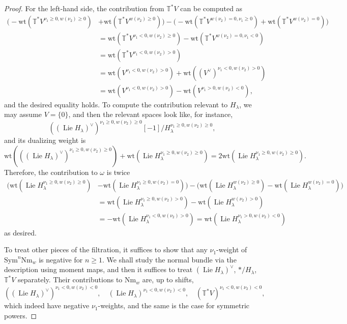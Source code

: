 \documentclass{amsart}
\theoremstyle{definition}
\theoremstyle{remark}
\numberwithin{equation}{section}
\DeclareMathOperator{\Lie}{Lie}
\newcommand{\Sym}{\mathrm{Sym}}
\newcommand{\T}{\mathbb{T}}
\newcommand{\wt}{\mathrm{wt}}
\newcommand{\Nm}{\mathrm{Nm}}
\begin{document}
\begin{proof}
For the left-hand side, the contribution from $\T^* V$ can be computed as
\begin{align*}
\bigl(-\wt(\T^* V^{\nu_1 \geq 0, w(\nu_2)\geq 0}) & +  \wt (\T^* V^{w(\nu_2)\geq 0})\bigr) -  \bigl(-\wt(\T^* V^{w(\nu_2)=0, \nu_1\geq 0}) + \wt(\T^* V^{w(\nu_2)=0})\bigr) \\
&=    
\wt(\T^* V^{\nu_1 < 0, w(\nu_2)\geq 0})  -  \wt(\T^* V^{w(\nu_2)=0, \nu_1 < 0}) \\
&=\wt(\T^* V^{\nu_1 < 0, w(\nu_2) >0}) \\
&=\wt(V^{\nu_1 <0, w(\nu_2) > 0}) + \wt((V^\vee)^{\nu_1 <0, w(\nu_2) > 0}) \\
&=\wt(V^{\nu_1 <0, w(\nu_2) > 0}) - \wt(V^{\nu_1 > 0, w(\nu_2) < 0}),
\end{align*}
and the desired equality holds. To compute the contribution relevant to $H_{\lambda}$, we may assume $V=\{0\}$, and then the relevant spaces look like, for instance, 
\[
((\Lie H_{\lambda})^\vee)^{\nu_1 \geq 0, w(\nu_2)\geq 0}[-1] / H^{\nu_1 \geq 0, w(\nu_2)\geq 0}_{\lambda}, 
\]
and its dualizing weight is
\[
\wt (((\Lie H_{\lambda})^\vee)^{\nu_1 \geq 0, w(\nu_2)\geq 0}) 
+ \wt (\Lie H^{\nu_1\geq 0, w(\nu_2)\geq 0}_{\lambda})=2\wt (\Lie H^{\nu_1\geq 0, w(\nu_2)\geq 0}_{\lambda}). 
\]
Therefore, the contribution to $\omega$ is twice
\begin{align*}
\bigl(\wt (\Lie H^{\nu_1\geq 0, w(\nu_2)\geq 0}_{\lambda}) &- \wt (\Lie H^{\nu_1\geq 0, w(\nu_2)=0}_{\lambda})\bigr) - \bigl(\wt (\Lie H^{w(\nu_2)\geq 0}_{\lambda})-\wt(\Lie H^{w(\nu_2)=0}_{\lambda})\bigr) \\
&=
\wt (\Lie H^{\nu_1\geq 0, w(\nu_2)> 0}_{\lambda}) - \wt (\Lie H^{w(\nu_2)> 0}_{\lambda}) \\
&=-\wt (\Lie H^{\nu_1 <0, w(\nu_2)> 0}_{\lambda})=\wt (\Lie H^{\nu_1 > 0, w(\nu_2)< 0}_{\lambda})
\end{align*}
as desired. 

To treat other pieces of the filtration, it suffices to show that any $\nu_1$-weight of $\Sym^n \Nm_w$ is negative for $n\geq 1$. We shall study the normal bundle via the description using moment maps, and then it suffices to treat $(\Lie H_{\lambda})^\vee$, $*/H_{\lambda}$, $\T^*V$ separately. Their contributions to $\mathrm{Nm}_w$ are, up to shifts,
\[
((\Lie H_{\lambda})^\vee)^{\nu_1 < 0, w(\nu_2)<0}, \quad (\Lie H_{\lambda})^{\nu_1 < 0, w(\nu_2)<0}, \quad 
(\T^* V)^{\nu_1 < 0, w(\nu_2)<0},
\]
which indeed have negative $\nu_1$-weights, and the same is the case for symmetric powers. 
\end{proof}
\end{document}
